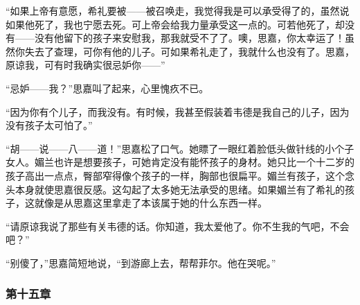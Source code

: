\par “如果上帝有意愿，希礼要被——被召唤走，我觉得我是可以承受得了的，虽然说如果他死了，我也宁愿去死。可上帝会给我力量承受这一点的。可若他死了，却没有——没有他留下的孩子来安慰我，那我就受不了了。噢，思嘉，你太幸运了！虽然你失去了查理，可你有他的儿子。可如果希礼走了，我就什么也没有了。思嘉，原谅我，可有时我确实很忌妒你——”
\par “忌妒——我？”思嘉叫了起来，心里愧疚不已。
\par “因为你有个儿子，而我没有。有时候，我甚至假装着韦德是我自己的儿子，因为没有孩子太可怕了。”
\par “胡——说——八——道！”思嘉松了口气。她瞟了一眼红着脸低头做针线的小个子女人。媚兰也许是想要孩子，可她肯定没有能怀孩子的身材。她只比一个十二岁的孩子高出一点点，臀部窄得像个孩子的一样，胸部也很扁平。媚兰有孩子，这个念头本身就使思嘉很反感。这勾起了太多她无法承受的思绪。如果媚兰有了希礼的孩子，这就像是从思嘉这里拿走了本该属于她的什么东西一样。
\par “请原谅我说了那些有关韦德的话。你知道，我太爱他了。你不生我的气吧，不会吧？”
\par “别傻了，”思嘉简短地说，“到游廊上去，帮帮菲尔。他在哭呢。”

\subsubsection{第十五章}


